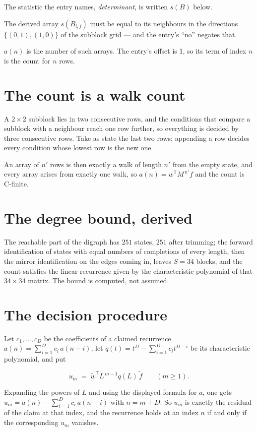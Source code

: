 \documentclass[11pt]{article}
\theoremstyle{definition}
\begin{document}
The statistic the entry names, {\itshape determinant}, is written $s(B)$ below.

The derived array $s(B_{i,j})$ must be equal to its neighbours in the directions $\{(0,1), (1,0)\}$ of the subblock grid --- and the entry's ``no'' negates that.

$a(n)$ is the number of such arrays. The entry's offset is 1, so its term of index $n$ is the count for $n$ rows.

\section{The count is a walk count}

A $2\times2$ subblock lies in two consecutive rows, and the conditions that compare a subblock with a neighbour reach one row further, so everything is decided by three consecutive rows. Take as state the last two rows; appending a row decides every condition whose lowest row is the new one.

An array of $n'$ rows is then exactly a walk of length $n'$ from the empty state, and every array arises from exactly one walk, so $a(n) = w^{\mathsf T}M^{\,n'}f$ and the count is C-finite.

\section{The degree bound, derived}

The reachable part of the digraph has $251$ states, $251$ after trimming; the forward identification of states with equal numbers of completions of every length, then the mirror identification on the edges coming in, leaves $S = 34$ blocks, and the count satisfies the linear recurrence given by the characteristic polynomial of that $34\times34$ matrix. The bound is computed, not assumed.

\section{The decision procedure}

Let $c_1,\dots,c_D$ be the coefficients of a claimed recurrence $a(n) = \sum_{i=1}^{D} c_i\,a(n-i)$, let $q(t) = t^{D} - \sum_{i=1}^{D} c_i t^{D-i}$ be its characteristic polynomial, and put

\[u_m \;=\; \tilde w^{\mathsf T} L^{\,m-1} q(L)\,\tilde f \qquad (m \ge 1).\]

Expanding the powers of $L$ and using the displayed formula for $a$, one gets $u_m = a(n) - \sum_{i=1}^{D} c_i\,a(n-i)$ with $n = m + D$. So $u_m$ is exactly the residual of the claim at that index, and the recurrence holds at an index $n$ if and only if the corresponding $u_m$ vanishes.
\end{document}
